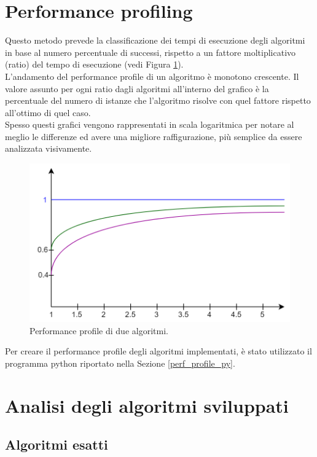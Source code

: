 \section{Performance profiling}
Questo metodo prevede la classificazione dei tempi di esecuzione degli algoritmi in base al numero percentuale di successi, rispetto a un fattore moltiplicativo (ratio) del tempo di esecuzione (vedi Figura \ref{perf_profile}).\\
L'andamento del performance profile di un algoritmo è monotono crescente. Il valore assunto per ogni ratio dagli algoritmi all'interno del grafico è la percentuale del numero di istanze che l'algoritmo risolve con quel fattore rispetto all'ottimo di quel caso.\\
Spesso questi grafici vengono rappresentati in scala logaritmica per notare al meglio le differenze ed avere una migliore raffigurazione, più semplice da essere analizzata visivamente.
\begin{figure}[h] 
\begin{center} 
  \includegraphics[scale=0.3]{Images/perf_profile} 
  \caption{\footnotesize{Performance profile di due algoritmi.}}
  \label{perf_profile} 
\end{center} 
\end{figure}

Per creare il performance profile degli algoritmi implementati, è stato utilizzato il programma python riportato nella Sezione \ref{perf_profile_py}. 

\section{Analisi degli algoritmi sviluppati}
\subsection{Algoritmi esatti}
